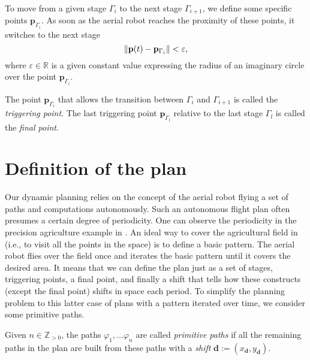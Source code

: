 To move from a given stage $\Gamma_i$ to the next stage $\Gamma_{i+1}$, we define some specific points $\mathbf{p}_{\Gamma_i}$. As soon as the aerial robot reaches the proximity of these points, it switches to the next stage
\begin{equation}\label{eq:trig-vareps}
  \left\lVert\mathbf{p}(t)-\mathbf{p}_{\Gamma_i}\right\rVert<\varepsilon,
\end{equation}
where $\varepsilon\in\mathbb{R}$ is a given constant value expressing the radius of an imaginary circle over the point $\mathbf{p}_{\Gamma_i}$.

\begin{highlight}  
  \begin{defn}\label{def:trigs}
    The point $\mathbf{p}_{\Gamma_{i}}$ that allows the transition between $\Gamma_i$ and $\Gamma_{i+1}$ is called the \emph{triggering point}. The last triggering point $\mathbf{p}_{\Gamma_{l}}$ relative to the last stage $\Gamma_l$ is called the \emph{final point}.
  \end{defn}
\end{highlight}


\section{Definition of the plan}
\label{sec:plan}

Our dynamic planning relies on the concept of the aerial robot flying a set of paths and computations autonomously. Such an autonomous flight plan often presumes a certain degree of periodicity. One can observe the periodicity in the precision agriculture example in . An ideal way to cover the agricultural field in  (i.e., to visit all the points in the space) is to define a basic pattern. The aerial robot flies over the field once and iterates the basic pattern until it covers the desired area. It means that we can define the plan just as a set of stages, triggering points, a final point, and finally a shift that tells how these constructs (except the final point) shifts in space each period. To simplify the planning problem to this latter case of plans with a pattern iterated over time, we consider some primitive paths.

\begin{highlight}
  \begin{defn}\label{def:primitive}
    Given $n\in\mathbb{Z}_{>0}$, the paths $\varphi_1,\dots\varphi_n$ are called \emph{primitive paths} if all the remaining paths in the plan are built from these paths with a \emph{shift} $\mathbf{d}:=(x_{\mathbf{d}},y_{\mathbf{d}})$. 
  \end{defn}
\end{highlight}

